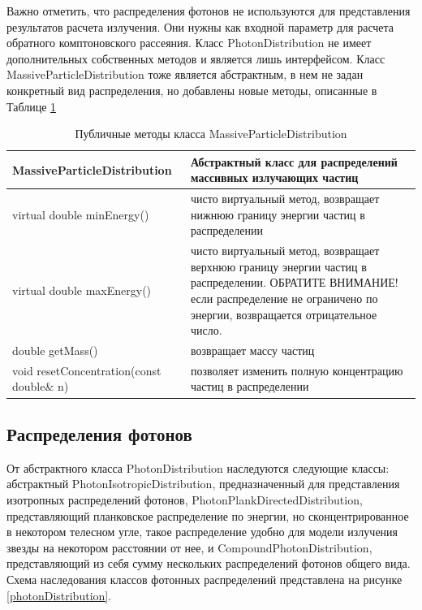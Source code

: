 Важно отметить, что распределения фотонов не используются для представления результатов расчета излучения. Они нужны как входной параметр для расчета обратного комптоновского рассеяния. Класс PhotonDistribution не имеет дополнительных собственных методов и является лишь интерфейсом. Класс MassiveParticleDistribution тоже является абстрактным, в нем не задан конкретный вид распределения, но добавлены новые методы, описанные в Таблице \ref{MassiveParticleDistribution}	
\begin{table}
	\begin{center}
		\caption{Публичные методы класса MassiveParticleDistribution }
		\label{MassiveParticleDistribution}
		\begin{small}
			\begin{tabularx}{\textwidth}{|X|X|}
				\hline
				\textbf{MassiveParticleDistribution} & Абстрактный класс для распределений массивных излучающих частиц\\
				\hline
				virtual double minEnergy() & чисто виртуальный метод, возвращает нижнюю границу энергии частиц в распределении\\
				\hline
				virtual double maxEnergy() & чисто виртуальный метод, возвращает верхнюю границу энергии частиц в распределении. ОБРАТИТЕ ВНИМАНИЕ! если распределение не ограничено по энергии, возвращается отрицательное число.\\
				\hline
				double getMass() & возвращает массу частиц \\
				\hline
				void resetConcentration(const double\& n) & позволяет изменить полную концентрацию частиц в распределении\\
				\hline
			\end{tabularx}
		\end{small}
	\end{center}
\end{table}
\subsection{Распределения фотонов}

От абстрактного класса PhotonDistribution наследуются следующие классы: абстрактный PhotonIsotropicDistribution, предназначенный для представления изотропных распределений фотонов, PhotonPlankDirectedDistribution, представляющий планковское распределение по энергии, но сконцентрированное в некотором телесном угле, такое распределение удобно для модели излучения звезды на некотором расстоянии от нее, и CompoundPhotonDistribution, представляющий из себя сумму нескольких распределений фотонов общего вида. Схема наследования классов фотонных распределений представлена на рисунке \ref{photonDistribution}.

